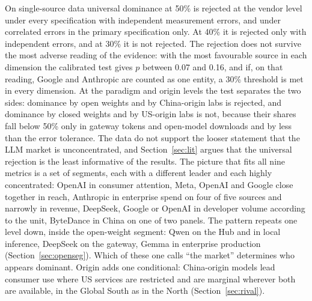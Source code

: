 \documentclass[11pt]{article}
\begin{document}
On single-source data universal dominance at 50\% is rejected at the vendor level under every specification with independent measurement errors, and under correlated errors in the primary specification only. At 40\% it is rejected only with independent errors, and at 30\% it is not rejected. The rejection does not survive the most adverse reading of the evidence: with the most favourable source in each dimension the calibrated test gives $p$ between 0.07 and 0.16, and if, on that reading, Google and Anthropic are counted as one entity, a 30\% threshold is met in every dimension. At the paradigm and origin levels the test separates the two sides: dominance by open weights and by China-origin labs is rejected, and dominance by closed weights and by US-origin labs is not, because their shares fall below 50\% only in gateway tokens and open-model downloads and by less than the error tolerance. The data do not support the looser statement that the LLM market is unconcentrated, and Section~\ref{sec:lit} argues that the universal rejection is the least informative of the results. The picture that fits all nine metrics is a set of segments, each with a different leader and each highly concentrated: OpenAI in consumer attention, Meta, OpenAI and Google close together in reach, Anthropic in enterprise spend on four of five sources and narrowly in revenue, DeepSeek, Google or OpenAI in developer volume according to the unit, ByteDance in China on one of two panels. The pattern repeats one level down, inside the open-weight segment: Qwen on the Hub and in local inference, DeepSeek on the gateway, Gemma in enterprise production (Section~\ref{sec:openseg}). Which of these one calls ``the market'' determines who appears dominant. Origin adds one conditional: China-origin models lead consumer use where US services are restricted and are marginal wherever both are available, in the Global South as in the North (Section~\ref{sec:rival}).
\end{document}
